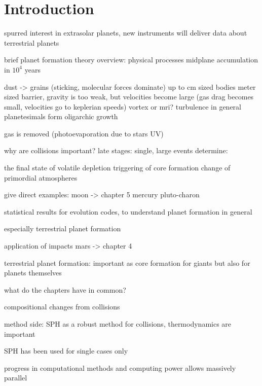 \cleardoublepage
\chapter{Introduction}
\label{ch01}

spurred interest in extrasolar planets, new instruments will deliver data about terrestrial planets

brief planet formation theory overview: physical processes 
midplane accumulation in $10^4$ years

dust -> grains (sticking, molecular forces dominate) up to cm sized bodies
meter sized barrier, gravity is too weak, but velocities become large (gas drag becomes small, velocities go to keplerian speeds)
vortex or mri? \cite{Johansen:2007p37} turbulence in general \citep{2008ApJ...686.1292I} planetesimals form
oligarchic growth

gas is removed (photoevaporation due to stars UV)





why are collisions important?
late stages: single, large events determine:

the final state of volatile depletion \citep{2001E&PSL.192..545H}
triggering of core formation \cite{1992Icar..100..326T}
change of primordial atmospheres \cite{2002DPS....34.2804A}

give direct examples:
moon -> chapter 5 \cite{Canup:2001p1861} \cite{1987Icar...71...30B} \cite{1975Icar...24..504H} \cite{1976LPI.....7..120C}
mercury \cite{Benz:1988p3336}
pluto-charon \cite{Canup:2005p1987}

statistical results for evolution codes, to understand planet formation in general

especially terrestrial planet formation \cite{2006Icar..184...39O} 

application of impacts mars -> chapter 4


\cite{Chambers:2004p4098}

terrestrial planet formation: important as core formation for giants but also for planets themselves


what do the chapters have in common?

compositional changes from collisions

method side: SPH as a robust method for collisions, thermodynamics are important

SPH has been used for single cases only

progress in computational methods and computing power allows massively parallel 



